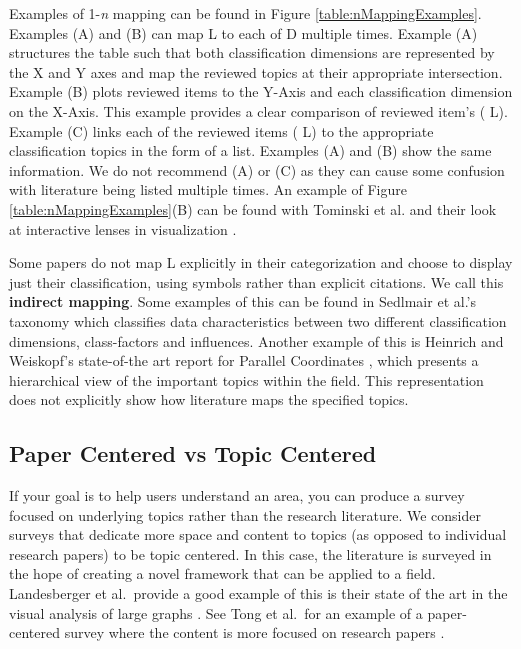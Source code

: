 Examples of 1-\textit{n} mapping can be found in Figure \ref{table:nMappingExamples}. Examples (A) and (B) can map {\color{blue} L} to each of {\color{red} D} multiple times. Example (A) structures the table such that both classification dimensions are represented by the X and Y axes and map the reviewed topics at their appropriate intersection. Example (B) plots reviewed items to the Y-Axis and each classification dimension on the X-Axis. This example provides a clear comparison of reviewed item's ({\color{blue} L}). Example (C) links each of the reviewed items ({\color{blue} L}) to the appropriate classification topics in the form of a list. Examples (A) and (B) show the same information.
We do not recommend (A) or (C) as they can cause some confusion with literature being listed multiple times. An example of Figure \ref{table:nMappingExamples}(B) can be found with Tominski et al. and their look at interactive lenses in visualization \cite{tominski2014survey}.

Some papers do not map {\color{blue} L} explicitly in their categorization and choose to display just their classification, using symbols rather than explicit citations. We call this \textbf{indirect mapping}. Some examples of this can be found in Sedlmair et al.'s  taxonomy \cite{sedlmair2012taxonomy} which classifies data characteristics between two different classification dimensions, class-factors and influences. Another example of this is Heinrich and Weiskopf's state-of-the art  report for Parallel Coordinates \cite{heinrich2013state}, which presents a hierarchical view of the important topics within the field. This representation does not explicitly show how literature maps the specified topics. 

\subsection{Paper Centered vs Topic Centered}
If your goal is to help users understand an area, you can produce a survey focused on underlying topics rather than the research literature. We consider surveys that dedicate more space and content to topics (as opposed to individual research papers) to be topic centered. In this case, the literature is surveyed in the hope of creating a novel framework that can be applied to a field. Landesberger et al.\ provide a good example of this  is their state of the art in the visual analysis of large graphs \cite{von2011visual}. See Tong et al.\ for an example of a paper-centered survey where the content is more focused on research papers \cite{tong2018storytelling}.


